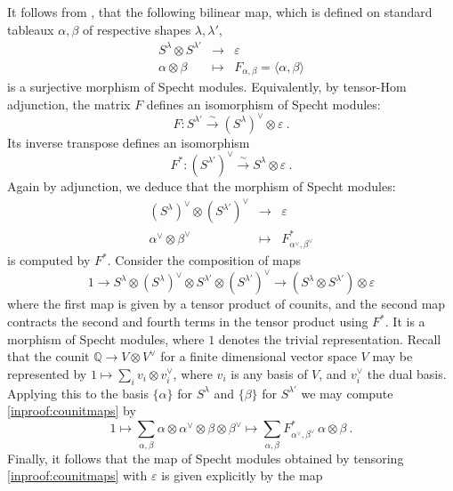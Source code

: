 \documentclass[10pt]{amsart}
\theoremstyle{definition}
\theoremstyle{remark}
\numberwithin{equation}{section}
\newcommand{\To}{\longrightarrow}
\newcommand{\Q}{\mathbb Q}
\newcommand{\lf}{\langle}
\newcommand{\rf}{\rangle}
\newcommand{\0}{\color{blue}{\mathsf{0}}}
\begin{document}
 It follows from \cite[Proposition 4.8]{Fayers}, that the following  bilinear map, which is defined on standard tableaux $
 \alpha, \beta$ of respective shapes $\lambda, \lambda'$,
 \begin{eqnarray} \label{ProjectStensSToEpsilon}
S^{\lambda} \otimes S^{\lambda'}  & \To & \varepsilon   \\ 
\alpha \otimes \beta & \mapsto & F_{\alpha, \beta} = \lf \alpha, \beta \rf \nonumber 
 \end{eqnarray} 
 is a surjective morphism of Specht modules.  Equivalently, by tensor-Hom adjunction, the matrix $F$ defines an isomorphism of Specht modules:
 \[ F: S^{\lambda'} \overset{\sim}{\To}   (S^{\lambda})^{\vee} \otimes \varepsilon\ .\]
Its inverse transpose  defines an isomorphism
 \[ F^*: \left(S^{\lambda'}\right)^{\vee} \overset{\sim}{\To}  S^{\lambda} \otimes \varepsilon \ . \]
 Again by adjunction, we deduce that the 
 morphism of Specht modules:
 \begin{eqnarray}
\left(S^{\lambda} \right)^{\vee} \otimes 
\left(S^{\lambda'} \right)^{\vee} & \To & \varepsilon\nonumber \\ 
\alpha^{\vee} \otimes \beta^{\vee} & \mapsto & F^*_{\alpha^{\vee}, \beta^{\vee}} \nonumber 
 \end{eqnarray}   
 is computed by  $F^*$.  Consider the composition of maps
 \begin{equation} \label{inproof:counitmaps} 1 \To S^{\lambda} \otimes (S^{\lambda})^{\vee} \otimes S^{\lambda'} \otimes (S^{\lambda'})^{\vee} \To (S^{\lambda}\otimes S^{\lambda'} )\otimes \varepsilon
 \end{equation} 
 where the first map is given by a  tensor product of counits, and the second map contracts the second and fourth terms in the tensor product using  $F^*$.
 It is a morphism of Specht modules, where $1$ denotes the trivial representation.   Recall that the counit $\Q \rightarrow V\otimes V^{\vee}$ for a  finite dimensional vector space $V$ may be represented by 
 $1 \mapsto \sum_{i} v_i \otimes v_i^{\vee}$, where $v_i$ is any basis of $V$, and $v_i^{\vee}$ the dual basis. 
 Applying this to the basis $\{\alpha\}$ for $S^{\lambda}$ and $\{\beta\}$ for $S^{\lambda'}$ we may compute   \eqref{inproof:counitmaps} by 
 \[ 1 \mapsto  \sum_{\alpha,\beta} \alpha \otimes \alpha^{\vee} \otimes \beta \otimes \beta^{\vee} \mapsto  \sum_{\alpha, \beta} F^*_{\alpha^{\vee}, \beta^{\vee}} \, \alpha\otimes \beta \ .   \]
 Finally,  it follows that the map of Specht modules obtained 
  by tensoring  \eqref{inproof:counitmaps} with $\varepsilon$ is given explicitly by the map
\end{document}
